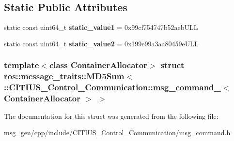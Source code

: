 \subsection*{\-Static \-Public \-Attributes}
\begin{DoxyCompactItemize}
\item 
\hypertarget{structros_1_1message__traits_1_1_m_d5_sum_3_01_1_1_c_i_t_i_u_s___control___communication_1_1msg_16c0523d0149fa8d0f3715a43a49bc93_a1aa15962d9496cfbc42317eec77d085f}{static const uint64\-\_\-t {\bfseries static\-\_\-value1} = 0x99cf754747b52aeb\-U\-L\-L}\label{structros_1_1message__traits_1_1_m_d5_sum_3_01_1_1_c_i_t_i_u_s___control___communication_1_1msg_16c0523d0149fa8d0f3715a43a49bc93_a1aa15962d9496cfbc42317eec77d085f}

\item 
\hypertarget{structros_1_1message__traits_1_1_m_d5_sum_3_01_1_1_c_i_t_i_u_s___control___communication_1_1msg_16c0523d0149fa8d0f3715a43a49bc93_ab8d9668828920117c19c0c38180b0278}{static const uint64\-\_\-t {\bfseries static\-\_\-value2} = 0x199e99a3aa80459e\-U\-L\-L}\label{structros_1_1message__traits_1_1_m_d5_sum_3_01_1_1_c_i_t_i_u_s___control___communication_1_1msg_16c0523d0149fa8d0f3715a43a49bc93_ab8d9668828920117c19c0c38180b0278}

\end{DoxyCompactItemize}
\subsubsection*{template$<$class Container\-Allocator$>$ struct ros\-::message\-\_\-traits\-::\-M\-D5\-Sum$<$ \-::\-C\-I\-T\-I\-U\-S\-\_\-\-Control\-\_\-\-Communication\-::msg\-\_\-command\-\_\-$<$ Container\-Allocator $>$ $>$}



\-The documentation for this struct was generated from the following file\-:\begin{DoxyCompactItemize}
\item 
msg\-\_\-gen/cpp/include/\-C\-I\-T\-I\-U\-S\-\_\-\-Control\-\_\-\-Communication/msg\-\_\-command.\-h\end{DoxyCompactItemize}
